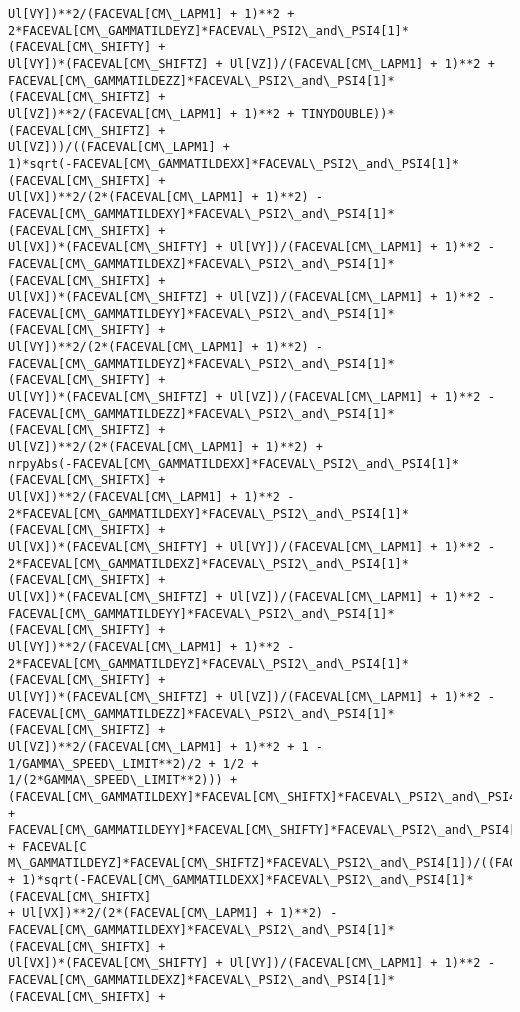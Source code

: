\documentclass[landscape,letterpaper,10pt,english]{article}
\begin{document}
\begin{Verbatim}[commandchars=\\\{\}]
Ul[VY])**2/(FACEVAL[CM\_LAPM1] + 1)**2 +
2*FACEVAL[CM\_GAMMATILDEYZ]*FACEVAL\_PSI2\_and\_PSI4[1]*(FACEVAL[CM\_SHIFTY] +
Ul[VY])*(FACEVAL[CM\_SHIFTZ] + Ul[VZ])/(FACEVAL[CM\_LAPM1] + 1)**2 +
FACEVAL[CM\_GAMMATILDEZZ]*FACEVAL\_PSI2\_and\_PSI4[1]*(FACEVAL[CM\_SHIFTZ] +
Ul[VZ])**2/(FACEVAL[CM\_LAPM1] + 1)**2 + TINYDOUBLE))*(FACEVAL[CM\_SHIFTZ] +
Ul[VZ]))/((FACEVAL[CM\_LAPM1] +
1)*sqrt(-FACEVAL[CM\_GAMMATILDEXX]*FACEVAL\_PSI2\_and\_PSI4[1]*(FACEVAL[CM\_SHIFTX] +
Ul[VX])**2/(2*(FACEVAL[CM\_LAPM1] + 1)**2) -
FACEVAL[CM\_GAMMATILDEXY]*FACEVAL\_PSI2\_and\_PSI4[1]*(FACEVAL[CM\_SHIFTX] +
Ul[VX])*(FACEVAL[CM\_SHIFTY] + Ul[VY])/(FACEVAL[CM\_LAPM1] + 1)**2 -
FACEVAL[CM\_GAMMATILDEXZ]*FACEVAL\_PSI2\_and\_PSI4[1]*(FACEVAL[CM\_SHIFTX] +
Ul[VX])*(FACEVAL[CM\_SHIFTZ] + Ul[VZ])/(FACEVAL[CM\_LAPM1] + 1)**2 -
FACEVAL[CM\_GAMMATILDEYY]*FACEVAL\_PSI2\_and\_PSI4[1]*(FACEVAL[CM\_SHIFTY] +
Ul[VY])**2/(2*(FACEVAL[CM\_LAPM1] + 1)**2) -
FACEVAL[CM\_GAMMATILDEYZ]*FACEVAL\_PSI2\_and\_PSI4[1]*(FACEVAL[CM\_SHIFTY] +
Ul[VY])*(FACEVAL[CM\_SHIFTZ] + Ul[VZ])/(FACEVAL[CM\_LAPM1] + 1)**2 -
FACEVAL[CM\_GAMMATILDEZZ]*FACEVAL\_PSI2\_and\_PSI4[1]*(FACEVAL[CM\_SHIFTZ] +
Ul[VZ])**2/(2*(FACEVAL[CM\_LAPM1] + 1)**2) +
nrpyAbs(-FACEVAL[CM\_GAMMATILDEXX]*FACEVAL\_PSI2\_and\_PSI4[1]*(FACEVAL[CM\_SHIFTX] +
Ul[VX])**2/(FACEVAL[CM\_LAPM1] + 1)**2 -
2*FACEVAL[CM\_GAMMATILDEXY]*FACEVAL\_PSI2\_and\_PSI4[1]*(FACEVAL[CM\_SHIFTX] +
Ul[VX])*(FACEVAL[CM\_SHIFTY] + Ul[VY])/(FACEVAL[CM\_LAPM1] + 1)**2 -
2*FACEVAL[CM\_GAMMATILDEXZ]*FACEVAL\_PSI2\_and\_PSI4[1]*(FACEVAL[CM\_SHIFTX] +
Ul[VX])*(FACEVAL[CM\_SHIFTZ] + Ul[VZ])/(FACEVAL[CM\_LAPM1] + 1)**2 -
FACEVAL[CM\_GAMMATILDEYY]*FACEVAL\_PSI2\_and\_PSI4[1]*(FACEVAL[CM\_SHIFTY] +
Ul[VY])**2/(FACEVAL[CM\_LAPM1] + 1)**2 -
2*FACEVAL[CM\_GAMMATILDEYZ]*FACEVAL\_PSI2\_and\_PSI4[1]*(FACEVAL[CM\_SHIFTY] +
Ul[VY])*(FACEVAL[CM\_SHIFTZ] + Ul[VZ])/(FACEVAL[CM\_LAPM1] + 1)**2 -
FACEVAL[CM\_GAMMATILDEZZ]*FACEVAL\_PSI2\_and\_PSI4[1]*(FACEVAL[CM\_SHIFTZ] +
Ul[VZ])**2/(FACEVAL[CM\_LAPM1] + 1)**2 + 1 - 1/GAMMA\_SPEED\_LIMIT**2)/2 + 1/2 +
1/(2*GAMMA\_SPEED\_LIMIT**2))) +
(FACEVAL[CM\_GAMMATILDEXY]*FACEVAL[CM\_SHIFTX]*FACEVAL\_PSI2\_and\_PSI4[1] +
FACEVAL[CM\_GAMMATILDEYY]*FACEVAL[CM\_SHIFTY]*FACEVAL\_PSI2\_and\_PSI4[1] + FACEVAL[C
M\_GAMMATILDEYZ]*FACEVAL[CM\_SHIFTZ]*FACEVAL\_PSI2\_and\_PSI4[1])/((FACEVAL[CM\_LAPM1]
+ 1)*sqrt(-FACEVAL[CM\_GAMMATILDEXX]*FACEVAL\_PSI2\_and\_PSI4[1]*(FACEVAL[CM\_SHIFTX]
+ Ul[VX])**2/(2*(FACEVAL[CM\_LAPM1] + 1)**2) -
FACEVAL[CM\_GAMMATILDEXY]*FACEVAL\_PSI2\_and\_PSI4[1]*(FACEVAL[CM\_SHIFTX] +
Ul[VX])*(FACEVAL[CM\_SHIFTY] + Ul[VY])/(FACEVAL[CM\_LAPM1] + 1)**2 -
FACEVAL[CM\_GAMMATILDEXZ]*FACEVAL\_PSI2\_and\_PSI4[1]*(FACEVAL[CM\_SHIFTX] +

\end{Verbatim}
\end{document}
